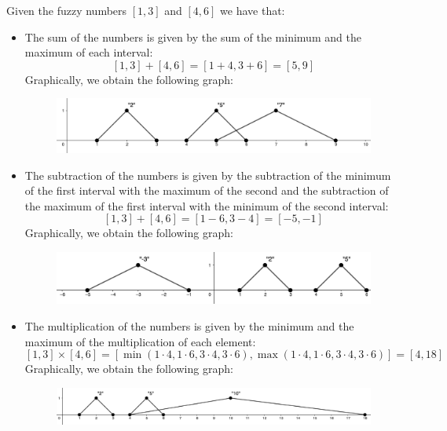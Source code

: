 \documentclass[12pt, a4paper]{report}
\newtheorem[L]{theorem}{Theorem}
\newtheorem[M]{corollary}{Corollary}
\newtheorem[M]{lemma}{Lemma}
\newtheorem[style=S,bodystyle=\normalfont]{definition}{Definition}
\begin{document}
    \begin{example}
        Given the fuzzy numbers $[1,3]$ and $[4,6]$ we have that:
        \begin{itemize}
            \item The sum of the numbers is given by the sum of the minimum and the maximum of each interval:
                \[[1,3]+[4,6]=[1+4,3+6]=[5,9]\]
                Graphically, we obtain the following graph:
                \begin{figure}[H]
                    \centering
                    \includegraphics[width=0.75\linewidth]{images/sum.png}
                \end{figure}
            \item The subtraction of the numbers is given by the subtraction of the minimum of the first interval with the maximum of the 
            second and the subtraction of the maximum of the first interval with the minimum of the second interval:
                \[[1,3]+[4,6]=[1-6,3-4]=[-5,-1]\]
                Graphically, we obtain the following graph:
                \begin{figure}[H]
                    \centering
                    \includegraphics[width=0.75\linewidth]{images/subtraction.png}
                \end{figure}
            \item The multiplication of the numbers is given by the minimum and the maximum of the multiplication of each element:
                \[[1,3] \times [4,6]=[\min(1 \cdot 4, 1 \cdot 6, 3 \cdot 4, 3 \cdot 6),\max(1 \cdot 4, 1 \cdot 6, 3 \cdot 4, 3 \cdot 6)]=[4,18]\]                Graphically, we obtain the following graph:
                \begin{figure}[H]
                    \centering
                    \includegraphics[width=0.75\linewidth]{images/multiplication.png}
                \end{figure}

\end{itemize}
\end{example}
\end{document}
